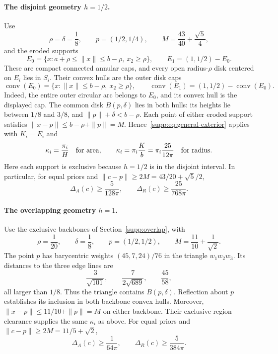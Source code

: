 \paragraph{The disjoint geometry $h=1/2$.}
Use
\[
 \rho=\delta=\frac18,\qquad p=(1/2,1/4),\qquad
 M=\frac{43}{40}+\frac{\sqrt5}{4},
\]
and the eroded supports
\[
 E_0=\{x:a+\rho\leq\|x\|\leq b-\rho,\ x_2\geq\rho\},
 \qquad E_1=(1,1/2)-E_0.
\]
These are compact connected annular caps, and every open radius-$\rho$ disk centered on $E_i$ lies in $S_i$. Their convex hulls are the outer disk caps
\[
 \operatorname{conv}(E_0)=\{x:\|x\|\leq b-\rho,\ x_2\geq\rho\},
 \qquad\operatorname{conv}(E_1)=(1,1/2)-\operatorname{conv}(E_0).
\]
Indeed, the entire outer circular arc belongs to $E_0$, and its convex hull is the displayed cap. The common disk $B(p,\delta)$ lies in both hulls: its heights lie between $1/8$ and $3/8$, and $\|p\|+\delta<b-\rho$. Each point of either eroded support satisfies $\|x-p\|\leq b-\rho+\|p\|=M$. Hence~\eqref{supp:eq:general-exterior} applies with $K_i=E_i$ and
\[
 \kappa_i=\frac{\pi_i}{H}\quad\hbox{for area},
 \qquad
 \kappa_i=\pi_i\frac{K}{b}=\pi_i\frac{25}{12\pi}
 \quad\hbox{for radius}.
\]
Here each support is exclusive because $h=1/2$ is in the disjoint interval. In particular, for equal priors and $\|c-p\|\geq2M=43/20+\sqrt5/2$,
\begin{equation}
 \Delta_A(c)\geq\frac5{128\pi},\qquad
 \Delta_R(c)\geq\frac{25}{768\pi}.
 \label{supp:eq:disjoint-exterior}
\end{equation}

\paragraph{The overlapping geometry $h=1$.}
Use the exclusive backbones of Section~\ref{supp:overlap}, with
\[
 \rho=\frac1{20},\qquad\delta=\frac18,
 \qquad p=(1/2,1/2),\qquad M=\frac{11}{10}+\frac1{\sqrt2}.
\]
The point $p$ has barycentric weights $(45,7,24)/76$ in the triangle $w_1w_2w_3$. Its distances to the three edge lines are
\[
 \frac3{\sqrt{101}},\qquad\frac7{2\sqrt{689}},\qquad\frac{45}{58},
\]
all larger than $1/8$. Thus the triangle contains $B(p,\delta)$. Reflection about $p$ establishes its inclusion in both backbone convex hulls. Moreover, $\|x-p\|\leq11/10+\|p\|=M$ on either backbone. Their exclusive-region clearance supplies the same $\kappa_i$ as above. For equal priors and $\|c-p\|\geq2M=11/5+\sqrt2$,
\begin{equation}
 \Delta_A(c)\geq\frac1{64\pi},\qquad
 \Delta_R(c)\geq\frac5{384\pi}.
 \label{supp:eq:overlap-exterior}
\end{equation}

